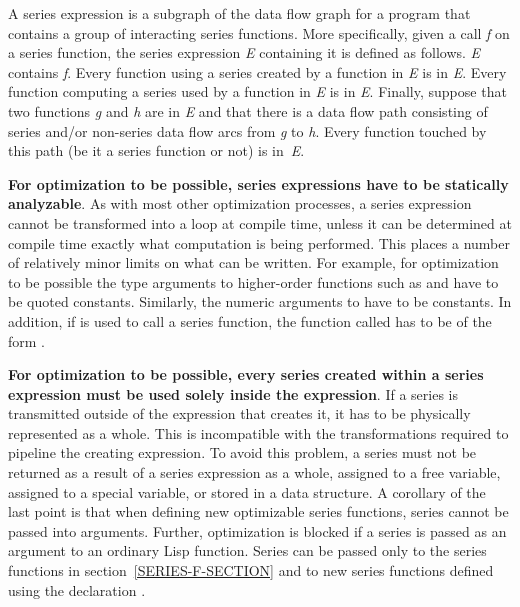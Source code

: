 A series expression is a subgraph of the data flow graph for a program that
contains a group of interacting series functions.  More specifically, given
a call \emph{f} on a series function, the series expression \emph{E} containing it is
defined as follows.  \emph{E} contains \emph{f}.  Every function using a series
created by a function in \emph{E} is in \emph{E}.  Every function computing a series
used by a function in \emph{E} is in \emph{E}.  Finally, suppose that two functions
\emph{g} and \emph{h} are in \emph{E} and that there is a data flow path consisting of
series and/or non-series data flow arcs from \emph{g} to \emph{h}.  Every function
touched by this path (be it a series function or not) is in~\emph{E}.

{\bf For optimization to be possible, series expressions have to be
statically analyzable}.  As with most other optimization processes, a
series expression cannot be transformed into a loop at compile time, unless
it can be determined at compile time exactly what computation is being
performed.  This places a number of relatively minor limits on what can be
written.  For example, for optimization to be possible the type arguments
to higher-order functions such as  and  have
to be quoted constants.  Similarly, the numeric arguments to 
have to be constants.  In addition, if  is used to call a
series function, the function called has to be of the
form .

{\bf For optimization to be possible, every series created within a series
expression must be used solely inside the expression}.  If a series is
transmitted outside of the expression that creates it, it has to be
physically represented as a whole.  This is incompatible with the
transformations required to pipeline the creating expression. To avoid this
problem, a series must not be returned as a result of a series expression
as a whole, assigned to a free variable, assigned to a special variable, or
stored in a data structure.  A corollary of the last point is that when
defining new optimizable series functions, series cannot be passed into
 arguments.  Further, optimization is blocked if a series is
passed as an argument to an ordinary Lisp function.  Series can be
passed only to the series functions in section~\ref{SERIES-F-SECTION} and to new series
functions defined using the declaration .

